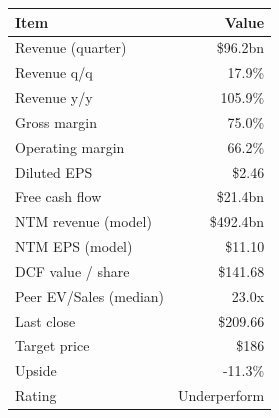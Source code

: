 \begin{tabular}{@{}lr@{}}
\toprule
Item & Value \\
\midrule
Revenue (quarter) & \$96.2bn \\
Revenue q/q & 17.9\% \\
Revenue y/y & 105.9\% \\
Gross margin & 75.0\% \\
Operating margin & 66.2\% \\
Diluted EPS & \$2.46 \\
Free cash flow & \$21.4bn \\
\midrule
NTM revenue (model) & \$492.4bn \\
NTM EPS (model) & \$11.10 \\
DCF value / share & \$141.68 \\
Peer EV/Sales (median) & 23.0x \\
Last close & \$209.66 \\
Target price & \$186 \\
Upside & -11.3\% \\
Rating & Underperform \\
\bottomrule
\end{tabular}
